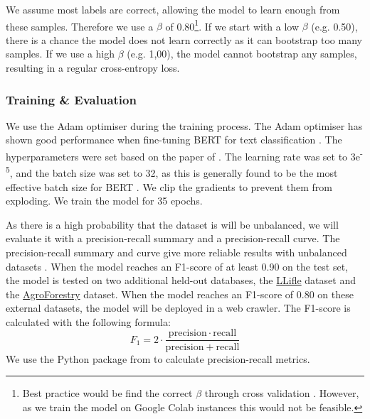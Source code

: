 \documentclass[a4paper, 12pt, oneside]{book} %
\begin{document}
We assume most labels are correct, allowing the model to learn enough from these samples.
Therefore we use a \(\beta\) of 0.80\footnote{Best practice would be find the correct \(\beta\) through cross validation \autocite{reed_training_2015, han_survey_2021}. However, as we train the model on Google Colab instances this would not be feasible.}.
If we start with a low \(\beta\) (e.g. 0.50), there is a chance the model does not learn correctly as it can bootstrap too many samples.
If we use a high \(\beta\) (e.g. 1,00), the model cannot bootstrap any samples, resulting in a regular cross-entropy loss.

\subsubsection{Training \& Evaluation}
We use the Adam optimiser \autocite{kingma_adam_2017} during the training process.
The Adam optimiser has shown good performance when fine-tuning BERT for text classification \autocite{you_large_2020}.
The hyperparameters were set based on the paper of \textcite{sun_how_2020}.
The learning rate was set to 3e\textsuperscript{-5}, and the batch size was set to 32, as this is generally found to be the most effective batch size for BERT \autocite{devlin_bert_2019, sanh_distilbert_2020, sun_how_2020, you_large_2020}.
We clip the gradients to prevent them from exploding. 
We train the model for 35 epochs.

As there is a high probability that the dataset is will be unbalanced, we will evaluate it with a precision-recall summary and a precision-recall curve.
The precision-recall summary and curve give more reliable results with unbalanced datasets \autocite{saito_precision-recall_2015}.
When the model reaches an F1-score of at least 0.90 on the test set, the model is tested on two additional held-out databases, the \href{http://www.llifle.com/}{LLifle} dataset and the \href{https://www.worldagroforestry.org/}{AgroForestry} dataset.
When the model reaches an F1-score of 0.80 on these external datasets, the model will be deployed in a web crawler.
The F1-score is calculated with the following formula:
\begin{equation}
    F_1 = 2 \cdot \frac{\mathrm{precision} \cdot \mathrm{recall}}{\mathrm{precision} + \mathrm{recall}} 
\end{equation}
We use the Python package from \textcite{pedregosa_scikit-learn_2011} to calculate precision-recall metrics.
\end{document}

